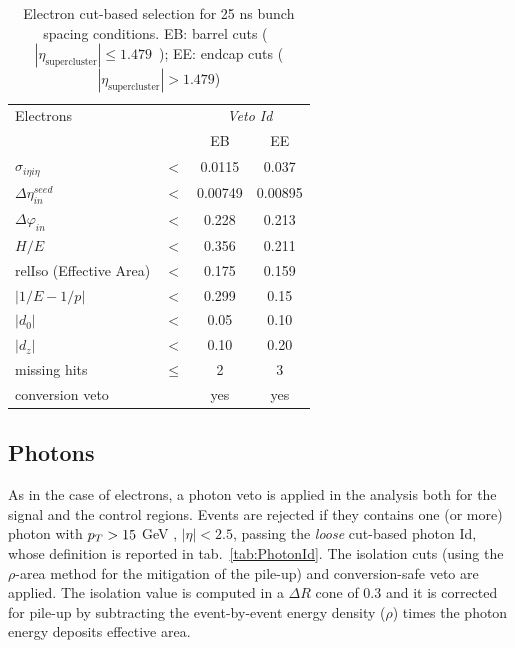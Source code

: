 \begin{table}[htb]
 \centering
\caption{Electron cut-based selection for 25 ns bunch spacing conditions. EB: barrel cuts (~$|\eta_\text{supercluster}| \leq 1.479$~); EE: endcap cuts ( $|\eta_\text{supercluster}| > 1.479$)}
    \begin{tabular}{l|ccc}
    Electrons                   &        & \multicolumn{2}{c}{\emph{Veto Id}}\\
                                &        & EB      & EE     \\
 \hline
 \hline
    $\sigma_{i\eta i\eta} $     & $ < $  &0.0115   &0.037  \\
    $\Delta \eta_{in}^{seed}$   & $ < $  &0.00749  &0.00895 \\
    $\Delta \varphi_{in} $      & $ < $  &0.228    &0.213   \\
    $H/E $                      & $ < $  &0.356    &0.211   \\
    relIso (Effective Area)                 & $<$    &0.175    &0.159   \\
    $|1/E - 1/p|$               & $ < $  &0.299    &0.15    \\
    $|d_0|$                     & $ < $  &0.05     &0.10   \\
    $|d_z|$                     & $ < $  &0.10     &0.20   \\
    missing hits                & $\leq$ &2        &3       \\
    conversion veto             &        &  yes    &yes     \\
    
\end{tabular}

\label{tab:EGcutBar}
\end{table}


\subsection{Photons}
As in the case of electrons, a photon veto is applied in the analysis both for the signal and the control regions. Events are rejected if they contains one (or more) photon with $p_T > 15$ GeV , $|\eta| < 2.5$, passing the \emph{loose} cut-based photon Id, whose definition is reported in tab.~\ref{tab:PhotonId}. The isolation cuts (using the $\rho$-area method for the mitigation of the pile-up) and conversion-safe veto are applied. The isolation value is computed in a $\Delta R$ cone of 0.3 and it is corrected for pile-up by subtracting the event-by-event energy density ($\rho$) times the photon energy deposits effective area.

